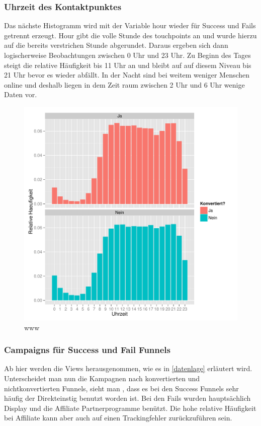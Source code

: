 \subsubsection*{Uhrzeit des Kontaktpunktes}
Das nächste Histogramm wird mit der Variable hour wieder für Success und Fails getrennt erzeugt. Hour gibt die volle Stunde des touchpoints an und wurde hierzu auf die bereits verstrichen Stunde abgerundet. Daraus ergeben sich dann logischerweise Beobachtungen zwischen 0 Uhr und 23 Uhr. Zu Beginn des Tages steigt die relative Häufigkeit bis 11 Uhr an und bleibt auf auf diesem Niveau bis 21 Uhr bevor es wieder abfällt. In der Nacht sind bei weitem weniger Menschen online und deshalb liegen in dem Zeit raum zwischen 2 Uhr und 6 Uhr wenige Daten vor.
\begin{figure}[H]
    \centering
    \includegraphics[scale=0.5]{hour.pdf}
    \caption{www}
    \label{Fig_2}
\end{figure}



\subsubsection*{Campaigns für Success und Fail Funnels}
 Ab hier werden die Views herausgenommen, wie es in \ref{datenlage} erläutert wird. Unterscheidet man nun die Kampagnen nach konvertierten und nichtkonvertierten Funnels, sieht man , dass es bei den Success Funnels sehr häufig der Direkteinstig benutzt worden ist. Bei den Fails wurden hauptsächlich Display und die Affiliate Partnerprogramme benützt. Die hohe relative Häufigkeit bei Affiliate kann aber 
auch auf einen Trackingfehler zurückzuführen sein.

